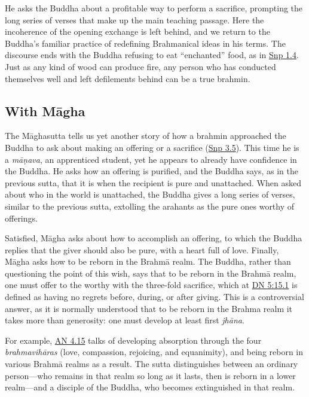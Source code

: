 \documentclass[12pt,openany]{book}%
\begin{document}
He asks the Buddha about a profitable way to perform a sacrifice, prompting the long series of verses that make up the main teaching passage. Here the incoherence of the opening exchange is left behind, and we return to the Buddha’s familiar practice of redefining Brahmanical ideas in his terms. The discourse ends with the Buddha refusing to eat “enchanted” food, as in \href{https://suttacentral.net/snp1.4/en/sujato}{Snp 1.4}. Just as any kind of wood can produce fire, any person who has conducted themselves well and left defilements behind can be a true brahmin.

\subsection*{With \textsanskrit{Māgha}}

The \textsanskrit{Māghasutta} tells us yet another story of how a brahmin approached the Buddha to ask about making an offering or a sacrifice (\href{https://suttacentral.net/snp3.5/en/sujato}{Snp 3.5}). This time he is a \textit{\textsanskrit{māṇava}}, an apprenticed student, yet he appears to already have confidence in the Buddha. He asks how an offering is purified, and the Buddha says, as in the previous sutta, that it is when the recipient is pure and unattached. When asked about who in the world is unattached, the Buddha gives a long series of verses, similar to the previous sutta, extolling the arahants as the pure ones worthy of offerings.

Satisfied, \textsanskrit{Māgha} asks about how to accomplish an offering, to which the Buddha replies that the giver should also be pure, with a heart full of love. Finally, \textsanskrit{Māgha} asks how to be reborn in the \textsanskrit{Brahmā} realm. The Buddha, rather than questioning the point of this wish, says that to be reborn in the \textsanskrit{Brahmā} realm, one must offer to the worthy with the three-fold sacrifice, which at \href{https://suttacentral.net/dn5/en/sujato\#15.1}{DN 5:15.1} is defined as having no regrets before, during, or after giving. This is a controversial answer, as it is normally understood that to be reborn in the Brahma realm it takes more than generosity: one must develop at least first \textit{\textsanskrit{jhāna}}.

For example, \href{https://suttacentral.net/an4.15/en/sujato}{AN 4.15} talks of developing absorption through the four \textit{\textsanskrit{brahmavihāras}} (love, compassion, rejoicing, and equanimity), and being reborn in various \textsanskrit{Brahmā} realms as a result. The sutta distinguishes between an ordinary person—who remains in that realm so long as it lasts, then is reborn in a lower realm—and a disciple of the Buddha, who becomes extinguished in that realm.
\end{document}
